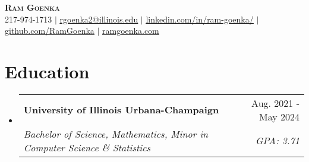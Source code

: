 \documentclass[letterpaper,11pt]{article}
\makeatletter
\newcommand{\resumeSubheading}[4]{
  \vspace{-2pt}\item
    \begin{tabular*}{0.97\textwidth}[t]{l@{\extracolsep{\fill}}r}
      \textbf{#1} & #2 \\
      \textit{\small#3} & \textit{\small #4} \\
    \end{tabular*}\vspace{-7pt}
}
\newcommand{\resumeSubheading}[4]{
  \vspace{-2pt}\item
    \begin{tabular*}{0.97\textwidth}[t]{l@{\extracolsep{\fill}}r}
      \textbf{#1} & #2 \\
      \textit{\small#3} & \textit{\small #4} \\
    \end{tabular*}\vspace{-7pt}
}
\newcommand{\resumeSubHeadingListStart}{\begin{itemize}[leftmargin=0.15in, label={}]}
\newcommand{\resumeSubHeadingListEnd}{\end{itemize}}
\makeatother
\begin{document}
\begin{center}
    \textbf{\Huge \scshape Ram Goenka} \\ \vspace{1pt}
    \small 217-974-1713 $|$ \href{mailto:rgoenka2@illinois.edu}{\underline{rgoenka2@illinois.edu}} $|$ 
    \href{https://www.linkedin.com/in/ram-goenka/}{\underline{linkedin.com/in/ram-goenka/}} $|$
    \href{https://github.com/RamGoenka}{\underline{github.com/RamGoenka}} $|$
    \href{http://ramgoenka.com/}{\underline{ramgoenka.com}}
\end{center}

\section{Education}
  \resumeSubHeadingListStart
    \resumeSubheading
      {University of Illinois Urbana-Champaign}{Aug. 2021 - May 2024}
      {Bachelor of Science, Mathematics, Minor in Computer Science \& Statistics}{GPA: 3.71}
  \resumeSubHeadingListEnd


\end{document}
